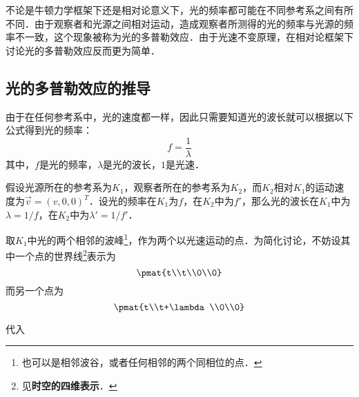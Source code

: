 

不论是牛顿力学框架下还是相对论意义下，光的频率都可能在不同参考系之间有所不同．由于观察者和光源之间相对运动，造成观察者所测得的光的频率与光源的频率不一致，这个现象被称为光的多普勒效应．由于光速不变原理，在相对论框架下讨论光的多普勒效应反而更为简单．


\subsection{光的多普勒效应的推导}
由于在任何参考系中，光的速度都一样，因此只需要知道光的波长就可以根据以下公式得到光的频率：
\begin{equation}
f=\frac{1}{\lambda}
\end{equation}
其中，$f$是光的频率，$\lambda$是光的波长，$1$是光速．

假设光源所在的参考系为$K_1$，观察者所在的参考系为$K_2$，而$K_2$相对$K_1$的运动速度为$\vec{v}=(v, 0, 0)^T$．设光的频率在$K_1$为$f$，在$K_2$中为$f'$，那么光的波长在$K_1$中为$\lambda=1/f$，在$K_2$中为$\lambda'=1/f'$．

取$K_1$中光的两个相邻的波峰\footnote{也可以是相邻波谷，或者任何相邻的两个同相位的点．}，作为两个以光速运动的点．为简化讨论，不妨设其中一个点的世界线\footnote{见\textbf{时空的四维表示}．}表示为
\begin{equation}
\pmat{t\\t\\0\\0}
\end{equation}
而另一个点为
\begin{equation}
\pmat{t\\t+\lambda\\0\\0}
\end{equation}

代入
